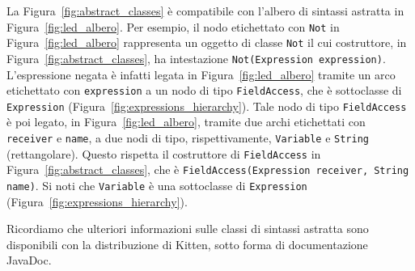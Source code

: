 La Figura~\ref{fig:abstract_classes} \`e compatibile
con l'albero di sintassi astratta in Figura~\ref{fig:led_albero}.
Per esempio, il nodo etichettato con
\texttt{Not} in Figura~\ref{fig:led_albero}
rappresenta un oggetto di classe \texttt{Not} il cui
costruttore, in Figura~\ref{fig:abstract_classes}, ha intestazione
\texttt{Not(Expression expression)}. L'espressione negata \`e infatti
legata in Figura~\ref{fig:led_albero} tramite un arco etichettato con
\texttt{expression} a un nodo di tipo \texttt{FieldAccess}, che
\`e sottoclasse di \texttt{Expression}
(Figura~\ref{fig:expressions_hierarchy}).
Tale nodo di tipo \texttt{FieldAccess} \`e poi legato, in
Figura~\ref{fig:led_albero}, tramite due archi etichettati con
\texttt{receiver} e \texttt{name}, a due nodi di tipo, rispettivamente,
\texttt{Variable} e \texttt{String} (rettangolare). Questo
rispetta il costruttore di \texttt{FieldAccess} in
Figura~\ref{fig:abstract_classes}, che \`e
\texttt{FieldAccess(Expression receiver, String name)}.
Si noti che \texttt{Variable} \`e una sottoclasse di \texttt{Expression}
(Figura~\ref{fig:expressions_hierarchy}).

Ricordiamo che ulteriori informazioni sulle classi di sintassi astratta sono
disponibili con la distribuzione di Kitten, sotto forma di documentazione
JavaDoc.
